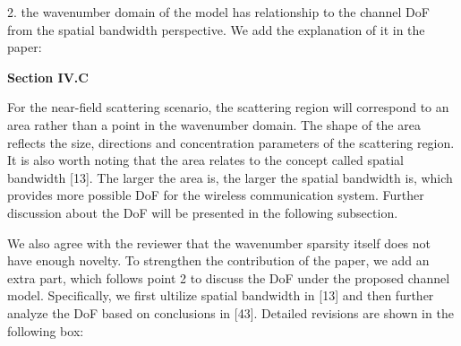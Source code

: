 \documentclass[a4paper,12pt]{article}
\begin{document}
{\color{blue}
2. the wavenumber domain of the model has relationship to the channel DoF from the spatial bandwidth perspective. We add the explanation of it in the paper:
}

\begin{framed}
	{\bf Section IV.C}

	\quad For the near-field scattering scenario, the scattering region will correspond to an area rather than a point in the wavenumber domain. The shape of the area reflects the size, directions and concentration parameters of the scattering region. {\color{red} It is also worth noting that the area relates to the concept called spatial bandwidth [13]. The larger the area is, the larger the spatial bandwidth is, which provides more possible DoF for the wireless communication system. Further discussion about the DoF will be presented in the following subsection.}
\end{framed}

{\color{blue}
We also agree with the reviewer that the wavenumber sparsity itself does not have enough novelty. To strengthen the contribution of the paper, we add an extra part, which follows point 2 to discuss the DoF under the proposed channel model. Specifically, we first ultilize spatial bandwidth in [13] and then further analyze the DoF based on conclusions in [43]. Detailed revisions are shown in the following box:
}
\end{document}
